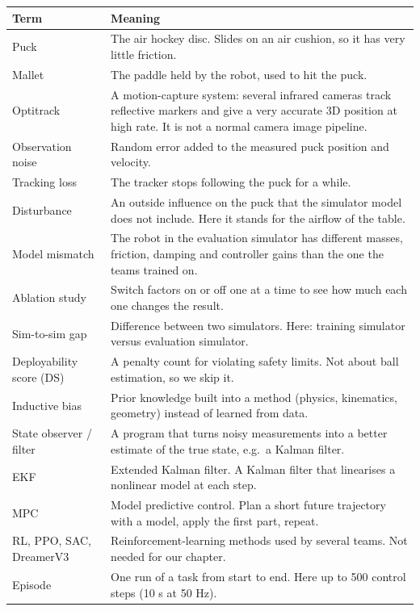 \documentclass[11pt,a4paper]{article}
\begin{document}
\begin{center}
\begin{tabularx}{\textwidth}{@{}l X@{}}
\toprule
Term & Meaning \\
\midrule
Puck & The air hockey disc. Slides on an air cushion, so it has very little friction. \\
Mallet & The paddle held by the robot, used to hit the puck. \\
Optitrack & A motion-capture system: several infrared cameras track reflective markers and give a very accurate 3D position at high rate. It is not a normal camera image pipeline. \\
Observation noise & Random error added to the measured puck position and velocity. \\
Tracking loss & The tracker stops following the puck for a while. \\
Disturbance & An outside influence on the puck that the simulator model does not include. Here it stands for the airflow of the table. \\
Model mismatch & The robot in the evaluation simulator has different masses, friction, damping and controller gains than the one the teams trained on. \\
Ablation study & Switch factors on or off one at a time to see how much each one changes the result. \\
Sim-to-sim gap & Difference between two simulators. Here: training simulator versus evaluation simulator. \\
Deployability score (DS) & A penalty count for violating safety limits. Not about ball estimation, so we skip it. \\
Inductive bias & Prior knowledge built into a method (physics, kinematics, geometry) instead of learned from data. \\
State observer / filter & A program that turns noisy measurements into a better estimate of the true state, e.g.\ a Kalman filter. \\
EKF & Extended Kalman filter. A Kalman filter that linearises a nonlinear model at each step. \\
MPC & Model predictive control. Plan a short future trajectory with a model, apply the first part, repeat. \\
RL, PPO, SAC, DreamerV3 & Reinforcement-learning methods used by several teams. Not needed for our chapter. \\
Episode & One run of a task from start to end. Here up to 500 control steps (10 s at 50 Hz). \\
\bottomrule
\end{tabularx}
\end{center}
\end{document}
